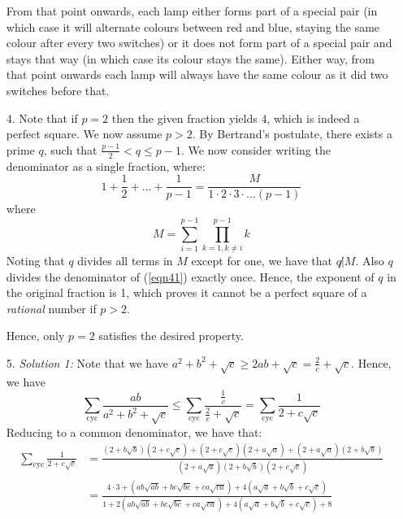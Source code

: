 \documentclass[a4paper, 12pt]{article}
\begin{document}
\begin{enumerate}
    From that point onwards, each lamp either forms part of a special pair (in which case it will alternate colours between red and blue, staying the same colour after every two switches) or it does not form part of a special pair and stays that way (in which case its colour stays the same). Either way, from that point onwards each lamp will always have the same colour as it did two switches before that.
    
    
    \item[4.] Note that if $p=2$ then the given fraction yields 4, which is indeed a perfect square. We now assume $p > 2$. By Bertrand's postulate, there exists a prime $q$, such that $\frac{p-1}{2} < q \leq p-1$. We now consider writing the denominator as a single fraction, where:
    \begin{equation} \label{eqn41}
        1+\frac{1}{2}+\dots+\frac{1}{p-1} = \frac{M}{1 \cdot 2 \cdot 3 \cdot \dots (p-1)}
    \end{equation}
    where
    $$ M = \sum_{i=1}^{p-1}  \prod_{k=1, k \neq i}^{p-1} k $$
    Noting that $q$ divides all terms in $M$ except for one, we have that $q \not | M$. Also $q$ divides the denominator of (\ref{eqn41}) exactly once. Hence, the exponent of $q$ in the original fraction is 1, which proves it cannot be a perfect square of a \textit{rational} number if $p>2$.
    
    Hence, only $p=2$ satisfies the desired property.
    

    \item[5.]  %
    \emph{Solution 1:} Note that we have $a^2 + b^2 + \sqrt{c} \geq 2ab + \sqrt{c} = \frac{2}{c} + \sqrt{c}$. Hence, we have
    $$ \sum_\textrm{cyc} \frac {ab}{a^2 + b^2 + \sqrt {c}} \leq \sum_\textrm{cyc} \frac{\frac{1}{c}}{\frac{2}{c} + \sqrt{c}} = \sum_\textrm{cyc} \frac{1}{2 + c\sqrt{c}} $$
    Reducing to a common denominator, we have that:
    \begin{align}
        \sum_\textrm{cyc} \frac{1}{2 + c\sqrt{c}} &= \frac{(2 + b \sqrt{b})(2 + c \sqrt{c}) + (2 + c \sqrt{c})(2 + a \sqrt{a}) + (2 + a \sqrt{a})(2 + b \sqrt{b})}{(2 + a \sqrt{a})(2 + b \sqrt{b})(2 + c \sqrt{c})} \nonumber \\
        &= \frac{4 \cdot 3 + (ab\sqrt{ab} + bc\sqrt{bc} + ca\sqrt{ca}) + 4(a\sqrt{a} + b\sqrt{b} + c\sqrt{c})}{1 + 2(ab\sqrt{ab} + bc\sqrt{bc} + ca\sqrt{ca}) + 4(a\sqrt{a} + b\sqrt{b} + c\sqrt{c}) + 8} \label{eqn51}
    \end{align} 
    

\end{enumerate}
\end{document}
